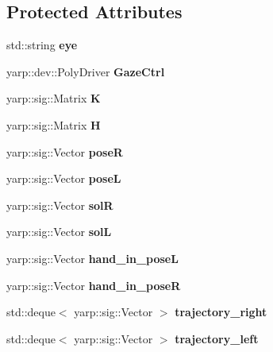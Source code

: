 \subsection*{Protected Attributes}
\begin{DoxyCompactItemize}
\item 
std\+::string {\bfseries eye}\label{classGraspVisualization_ace61511b9d00f72c39311e6213dc4047}

\item 
yarp\+::dev\+::\+Poly\+Driver {\bfseries Gaze\+Ctrl}\label{classGraspVisualization_ad7bdd9a15a2c683a358e77bb694598d2}

\item 
yarp\+::sig\+::\+Matrix {\bfseries K}\label{classGraspVisualization_a36a4e8dd697faf597dcb41d95aac83de}

\item 
yarp\+::sig\+::\+Matrix {\bfseries H}\label{classGraspVisualization_a422df68dee6c62ba04f00677dccae57e}

\item 
yarp\+::sig\+::\+Vector {\bfseries poseR}\label{classGraspVisualization_ab78d3c9bb633b704b22244db49b08423}

\item 
yarp\+::sig\+::\+Vector {\bfseries poseL}\label{classGraspVisualization_afe153394fdf1ffd1b70a3396d469188d}

\item 
yarp\+::sig\+::\+Vector {\bfseries solR}\label{classGraspVisualization_a2f2c72e622512ee74014e3715beba78b}

\item 
yarp\+::sig\+::\+Vector {\bfseries solL}\label{classGraspVisualization_a4952ee1be9e70461326b47ef50f064f2}

\item 
yarp\+::sig\+::\+Vector {\bfseries hand\+\_\+in\+\_\+poseL}\label{classGraspVisualization_a25591f12c24270bc2257eb2a5446e85d}

\item 
yarp\+::sig\+::\+Vector {\bfseries hand\+\_\+in\+\_\+poseR}\label{classGraspVisualization_ae4f26a3c1c3c4b51ac043bdfb1176092}

\item 
std\+::deque$<$ yarp\+::sig\+::\+Vector $>$ {\bfseries trajectory\+\_\+right}\label{classGraspVisualization_af2ad3c4bb204694b6948fa99d508282f}

\item 
std\+::deque$<$ yarp\+::sig\+::\+Vector $>$ {\bfseries trajectory\+\_\+left}\label{classGraspVisualization_a8d400d538af6c649485081f306d43e3e}


\end{DoxyCompactItemize}
